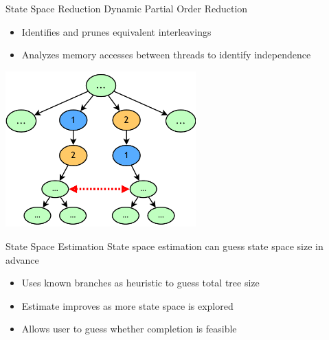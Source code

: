\documentclass[xcolor=dvipsnames]{beamer}
\begin{document}

\begin{frame}{State Space Reduction}
Dynamic Partial Order Reduction%
	\begin{itemize}
		\item Identifies and prunes equivalent interleavings
		\item Analyzes memory accesses between threads to identify independence
	\end{itemize}
	\pause
	\begin{center}
		\includegraphics[width=0.55\textwidth]{dpor.pdf}
	\end{center}

\end{frame}

\begin{frame}{State Space Estimation}
	State space estimation can guess state space size in advance
	\begin{itemize}
		\item Uses known branches as heuristic to guess total tree size
		\item Estimate improves as more state space is explored
		\item Allows user to guess whether completion is feasible
	\end{itemize}

\end{frame}
\end{document}
